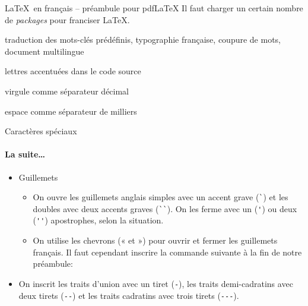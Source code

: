 \begin{frame}[fragile]{\LaTeX\ en français -- préambule pour pdf\LaTeX}
	Il faut charger un certain nombre de \emph{packages} pour franciser \LaTeX.
	

	\pause
	\begin{description}
		\item[babel] traduction des mots-clés prédéfinis, typographie française, coupure de mots,
			document multilingue
			
		\pause
		\item[inputenc et fontenc] lettres accentuées dans le code source
		
		\pause
		\item[icomma] virgule comme séparateur décimal
		
		\pause
		\item[numprint] espace comme séparateur de milliers
	\end{description}
\end{frame}

\begin{frame}[fragile]{Caractères spéciaux}
	\framesubtitle{La suite\ldots}
	\begin{itemize}
		\item Guillemets
			\begin{itemize}
				\item On ouvre les guillemets anglais simples avec un accent grave (\lstinline|`|)
					et les doubles avec deux accents graves (\lstinline|``|). On les ferme avec un 
					(\lstinline|'|) ou deux (\lstinline|''|) apostrophes, selon la situation.
				\item On utilise les chevrons (« et ») pour ouvrir et fermer les guillemets français.
					Il faut cependant inscrire la commande suivante à la fin de notre préambule:
\begin{codesource}
\end{codesource}				
			\end{itemize}
		\item On inscrit les traits d'union avec un tiret (\lstinline|-|), les traits demi-cadratins avec deux tirets (\lstinline|--|) et les traits cadratins avec trois tirets (\lstinline|---|).
	\end{itemize}
\end{frame}